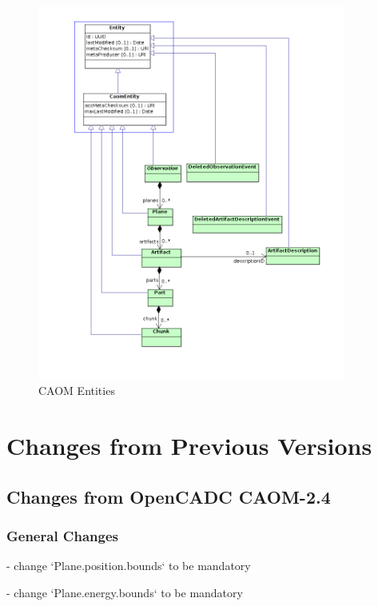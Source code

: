\documentclass[11pt,a4paper]{ivoa}
\begin{document}
\begin{figure}
\centering
\includegraphics[width=0.9\textwidth]{src/uml/CAOM4entities.png}
\caption{CAOM Entities}
\label{fig:entity}
\end{figure}




\appendix
\section{Changes from Previous Versions}

\subsection{Changes from OpenCADC CAOM-2.4}

\subsubsection{General Changes}

- change `Plane.position.bounds` to be mandatory

- change `Plane.energy.bounds` to be mandatory
\end{document}
